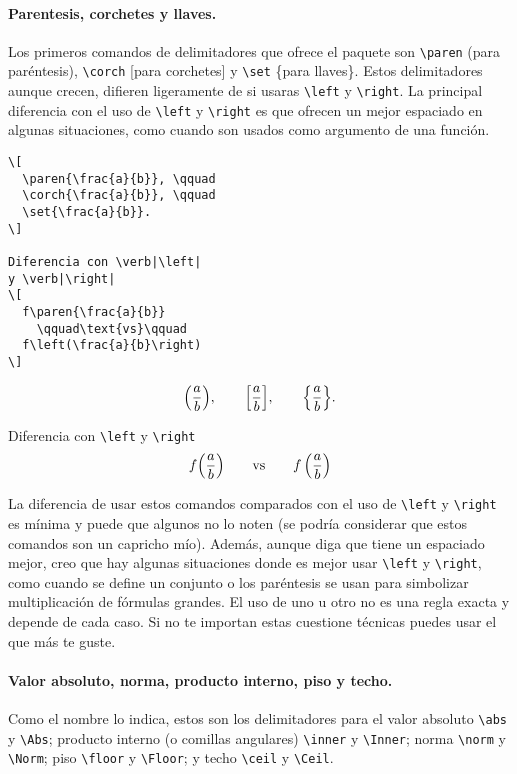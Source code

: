 \documentclass[11pt]{article}
\begin{document}
\paragraph{Parentesis, corchetes y llaves.} Los primeros comandos de delimitadores que ofrece el paquete son \verb|\paren| (para paréntesis), \verb|\corch| [para corchetes] y \verb|\set| \{para llaves\}. Estos delimitadores aunque crecen, difieren ligeramente de si usaras \verb|\left| y \verb|\right|. La principal diferencia con el uso de \verb|\left| y \verb|\right| es que ofrecen un mejor espaciado en algunas situaciones, como cuando son usados como argumento de una función.

\begin{center}
  \begin{minipage}{0.45\textwidth}
  \begin{verbatim}\[
  \paren{\frac{a}{b}}, \qquad
  \corch{\frac{a}{b}}, \qquad
  \set{\frac{a}{b}}.
\]

Diferencia con \verb|\left|
y \verb|\right|
\[
  f\paren{\frac{a}{b}}
    \qquad\text{vs}\qquad
  f\left(\frac{a}{b}\right)
\]\end{verbatim}
  \end{minipage}
  \begin{minipage}{0.45\textwidth}
  \[
    \paren{\frac{a}{b}}, \qquad
    \corch{\frac{a}{b}}, \qquad
    \set{\frac{a}{b}}.
  \]

  Diferencia con \verb|\left| y \verb|\right|
  \[
    f\paren{\frac{a}{b}}
      \qquad\text{vs}\qquad
    f\left(\frac{a}{b}\right)
  \]
  \end{minipage}
\end{center}

La diferencia de usar estos comandos comparados con el uso de \verb|\left| y \verb|\right| es mínima y puede que algunos no lo noten (se podría considerar que estos comandos son un capricho mío). Además, aunque diga que tiene un espaciado mejor, creo que hay algunas situaciones donde es mejor usar \verb|\left| y \verb|\right|, como cuando se define un conjunto o los paréntesis se usan para simbolizar multiplicación de fórmulas grandes. El uso de uno u otro no es una regla exacta y depende de cada caso. Si no te importan estas cuestione técnicas puedes usar el que más te guste.

\paragraph{Valor absoluto, norma, producto interno, piso y techo.} Como el nombre lo indica, estos son los delimitadores para el valor absoluto \verb|\abs| y \verb|\Abs|; producto interno (o comillas angulares) \verb|\inner| y \verb|\Inner|; norma \verb|\norm| y \verb|\Norm|; piso \verb|\floor| y \verb|\Floor|; y techo \verb|\ceil| y \verb|\Ceil|.
\end{document}
